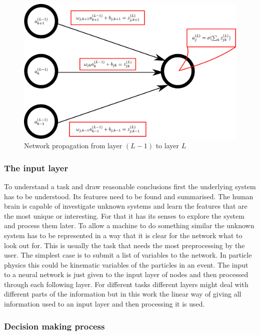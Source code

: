 \begin{figure}
	\centering
	\includegraphics[scale=0.18]{figures_ML/nodes_nomenclature.eps}
	\caption{Network propagation from layer $(L-1)$ to layer $L$}
	\label{fig:nodes_nomenclature}
\end{figure}


\subsubsection{The input layer}

To understand a task and draw reasonable conclusions first the underlying system has to be understood. Its features need to be found and summarised. The human brain is capable of investigate unknown systems and learn the features that are the most unique or interesting. For that it has its senses to explore the system and process them later. To allow a machine to do something similar the unknown system has to be represented in a way that it is clear for the network what to look out for. This is usually the task that needs the most preprocessing by the user. The simplest case is to submit a list of variables to the network. In particle physics this could be kinematic variables of the particles in an event.
The input to a neural network is just given to the input layer of nodes and then processed through each following layer. For different tasks different layers might deal with different parts of the information but in this work the linear way of giving all information used to an input layer and then processing it is used.

\subsubsection{Decision making process}

